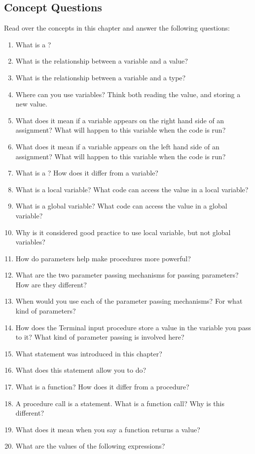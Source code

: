 \subsection{Concept Questions} %
\label{sub:concept_questions_data}

Read over the concepts in this chapter and answer the following questions:
\begin{enumerate}
  \item What is a ?
  \item What is the relationship between a variable and a value?
  \item What is the relationship between a variable and a type?
  \item Where can you use variables? Think both reading the value, and storing a new value.
  \item What does it mean if a variable appears on the right hand side of an assignment? What will happen to this variable when the code is run?
  \item What does it mean if a variable appears on the left hand side of an assignment? What will happen to this variable when the code is run?
  \item What is a ? How does it differ from a variable?
  \item What is a local variable? What code can access the value in a local variable?
  \item What is a global variable? What code can access the value in a global variable?
  \item Why is it considered good practice to use local variable, but not global variables?
  \item How do parameters help make procedures more powerful?
  \item What are the two parameter passing mechanisms for passing parameters? How are they different?
  \item When would you use each of the parameter passing mechanisms? For what kind of parameters?
  \item How does the Terminal input procedure store a value in the variable you pass to it? What kind of parameter passing is involved here?
  \item What statement was introduced in this chapter?
  \item What does this statement allow you to do?
  \item What is a function? How does it differ from a procedure?
  \item A procedure call is a statement. What is a function call? Why is this different?
  \item What does it mean when you say a function returns a value? 
  \item What are the values of the following expressions?
  

\end{enumerate}
